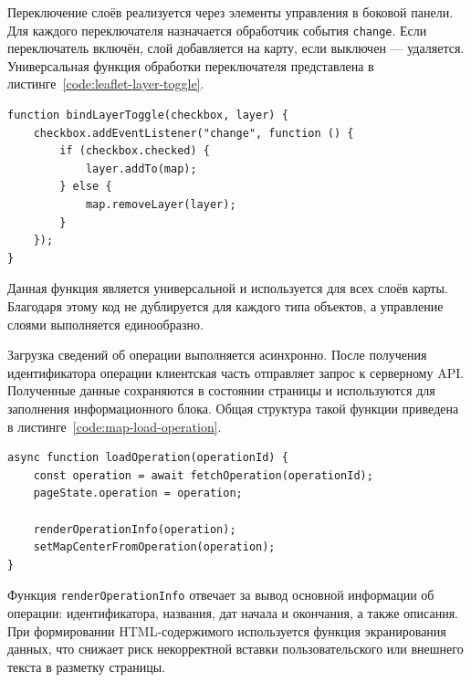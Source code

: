 Переключение слоёв реализуется через элементы управления в боковой панели. Для каждого переключателя назначается обработчик события \texttt{change}. Если переключатель включён, слой добавляется на карту, если выключен --- удаляется. Универсальная функция обработки переключателя представлена в листинге~\ref{code:leaflet-layer-toggle}.

\begin{code}
\label{code:leaflet-layer-toggle}
\vspace{-0.75cm}
\begin{verbatim}
function bindLayerToggle(checkbox, layer) {
    checkbox.addEventListener("change", function () {
        if (checkbox.checked) {
            layer.addTo(map);
        } else {
            map.removeLayer(layer);
        }
    });
}
\end{verbatim}
\end{code}

Данная функция является универсальной и используется для всех слоёв карты. Благодаря этому код не дублируется для каждого типа объектов, а управление слоями выполняется единообразно.

Загрузка сведений об операции выполняется асинхронно. После получения идентификатора операции клиентская часть отправляет запрос к серверному API. Полученные данные сохраняются в состоянии страницы и используются для заполнения информационного блока. Общая структура такой функции приведена в листинге~\ref{code:map-load-operation}.

\begin{code}
\label{code:map-load-operation}
\vspace{-0.75cm}
\begin{verbatim}
async function loadOperation(operationId) {
    const operation = await fetchOperation(operationId);
    pageState.operation = operation;

    renderOperationInfo(operation);
    setMapCenterFromOperation(operation);
}
\end{verbatim}
\end{code}

Функция \texttt{renderOperationInfo} отвечает за вывод основной информации об операции: идентификатора, названия, дат начала и окончания, а также описания. При формировании HTML-содержимого используется функция экранирования данных, что снижает риск некорректной вставки пользовательского или внешнего текста в разметку страницы.

